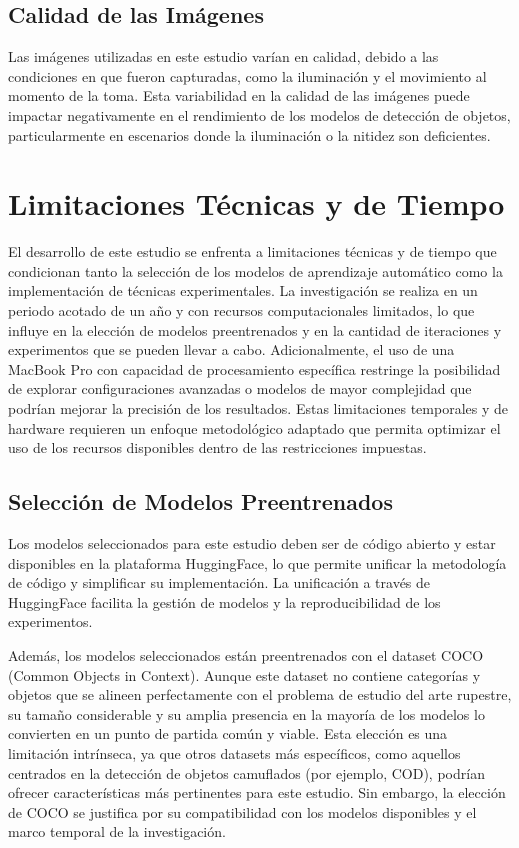 \subsection{Calidad de las Imágenes}
Las imágenes utilizadas en este estudio varían en calidad, debido a las condiciones en que fueron capturadas, como la iluminación y el movimiento al momento de la toma. Esta variabilidad en la calidad de las imágenes puede impactar negativamente en el rendimiento de los modelos de detección de objetos, particularmente en escenarios donde la iluminación o la nitidez son deficientes.

\section{Limitaciones Técnicas y de Tiempo}

El desarrollo de este estudio se enfrenta a limitaciones técnicas y de tiempo que condicionan tanto la selección de los modelos de aprendizaje automático como la implementación de técnicas experimentales. La investigación se realiza en un periodo acotado de un año y con recursos computacionales limitados, lo que influye en la elección de modelos preentrenados y en la cantidad de iteraciones y experimentos que se pueden llevar a cabo. Adicionalmente, el uso de una MacBook Pro con capacidad de procesamiento específica restringe la posibilidad de explorar configuraciones avanzadas o modelos de mayor complejidad que podrían mejorar la precisión de los resultados. Estas limitaciones temporales y de hardware requieren un enfoque metodológico adaptado que permita optimizar el uso de los recursos disponibles dentro de las restricciones impuestas.

\subsection{Selección de Modelos Preentrenados}
Los modelos seleccionados para este estudio deben ser de código abierto y estar disponibles en la plataforma HuggingFace, lo que permite unificar la metodología de código y simplificar su implementación. La unificación a través de HuggingFace facilita la gestión de modelos y la reproducibilidad de los experimentos.

Además, los modelos seleccionados están preentrenados con el dataset COCO (Common Objects in Context). Aunque este dataset no contiene categorías y objetos que se alineen perfectamente con el problema de estudio del arte rupestre, su tamaño considerable y su amplia presencia en la mayoría de los modelos lo convierten en un punto de partida común y viable. Esta elección es una limitación intrínseca, ya que otros datasets más específicos, como aquellos centrados en la detección de objetos camuflados (por ejemplo, COD), podrían ofrecer características más pertinentes para este estudio. Sin embargo, la elección de COCO se justifica por su compatibilidad con los modelos disponibles y el marco temporal de la investigación.

